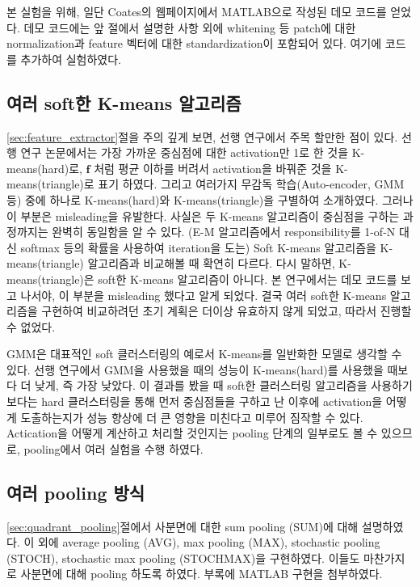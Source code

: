 \documentclass[a4paper,9pt]{article}
\begin{document}
\begin{multicols*}{2}
본 실험을 위해, 일단 Coates의 웹페이지에서 MATLAB으로 작성된 데모 코드를 얻었다.
데모 코드에는 앞 절에서 설명한 사항 외에 whitening 등 patch에 대한 normalization과 feature 벡터에 대한 standardization이 포함되어 있다.
여기에 코드를 추가하여 실험하였다.

\subsection{여러 soft한 K-means 알고리즘}

\ref{sec:feature_extractor}절을 주의 깊게 보면, 선행 연구에서 주목 할만한 점이 있다.
선행 연구 논문에서는 가장 가까운 중심점에 대한 activation만 1로 한 것을 K-means(hard)로, $\mathbf{f}$ 처럼 평균 이하를 버려서 activation을 바꿔준 것을 K-means(triangle)로 표기 하였다.
그리고 여러가지 무감독 학습(Auto-encoder, GMM 등) 중에 하나로 K-means(hard)와 K-means(triangle)을 구별하여 소개하였다.
그러나 이 부분은 misleading을 유발한다.
사실은 두 K-means 알고리즘이 중심점을 구하는 과정까지는 완벽히 동일함을 알 수 있다.
(E-M 알고리즘에서 responsibility를 1-of-N 대신 softmax 등의 확률을 사용하여 iteration을 도는) Soft K-means 알고리즘을 K-means(triangle) 알고리즘과 비교해볼 때 확연히 다르다.
다시 말하면, K-means(triangle)은 soft한 K-means 알고리즘이 아니다.
본 연구에서는 데모 코드를 보고 나서야, 이 부분을 misleading 했다고 알게 되었다.
결국 여러 soft한 K-means 알고리즘을 구현하여 비교하려던 초기 계획은 더이상 유효하지 않게 되었고, 따라서 진행할 수 없었다.

GMM은 대표적인 soft 클러스터링의 예로서 K-means를 일반화한 모델로 생각할 수 있다.
선행 연구에서 GMM을 사용했을 때의 성능이 K-means(hard)를 사용했을 때보다 더 낮게, 즉 가장 낮았다.
이 결과를 봤을 때 soft한 클러스터링 알고리즘을 사용하기 보다는 hard 클러스터링을 통해 먼저 중심점들을 구하고 난 이후에 activation을 어떻게 도출하는지가 성능 향상에 더 큰 영향을 미친다고 미루어 짐작할 수 있다.
Actication을 어떻게 계산하고 처리할 것인지는 pooling 단계의 일부로도 볼 수 있으므로, pooling에서 여러 실험을 수행 하였다.

\subsection{여러 pooling 방식}

\ref{sec:quadrant_pooling}절에서 사분면에 대한 sum pooling (SUM)에 대해 설명하였다.
이 외에 average pooling (AVG), max pooling (MAX), stochastic pooling (STOCH), stochastic max pooling (STOCHMAX)을 구현하였다.
이들도 마찬가지로 사분면에 대해 pooling 하도록 하였다.
부록에 MATLAB 구현을 첨부하였다.


\end{multicols*}
\end{document}
